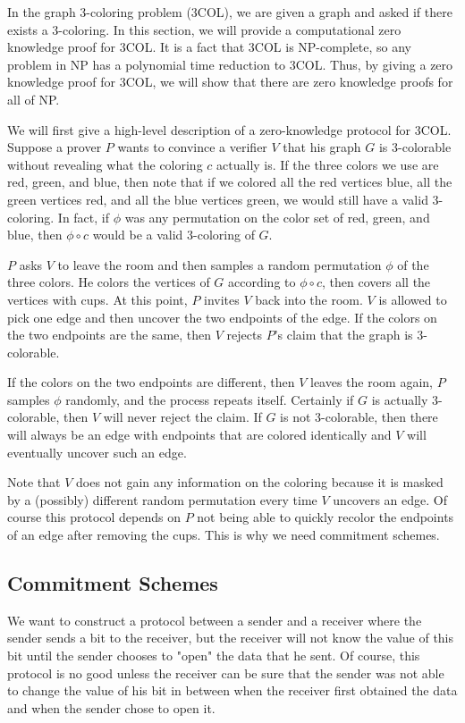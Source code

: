 \documentclass[12pt]{tufte-book}
\begin{document}
In the graph 3-coloring problem (3COL), we are given a graph and asked if there exists a 3-coloring. In this section, we will provide a computational zero knowledge proof for 3COL. It is a fact that 3COL is NP-complete, so any problem in NP has a polynomial time reduction to 3COL. Thus, by giving a zero knowledge proof for 3COL, we will show that there are zero knowledge proofs for all of NP.

We will first give a high-level description of a zero-knowledge protocol for 3COL. Suppose a prover $P$ wants to convince a verifier $V$ that his graph $G$ is 3-colorable without revealing what the coloring $c$ actually is. If the three colors we use are red, green, and blue, then note that if we colored all the red vertices blue, all the green vertices red, and all the blue vertices green, we would still have a valid 3-coloring. In fact, if $\phi$ was any permutation on the color set of red, green, and blue, then $\phi \circ c$ would be a valid 3-coloring of $G$.

$P$ asks $V$ to leave the room and then samples a random permutation $\phi$ of the three colors. He colors the vertices of $G$ according to $\phi \circ c$, then covers all the vertices with cups. At this point, $P$ invites $V$ back into the room. $V$ is allowed to pick one edge and then uncover the two endpoints of the edge. If the colors on the two endpoints are the same, then $V$ rejects $P$'s claim that the graph is 3-colorable.

If the colors on the two endpoints are different, then $V$ leaves the room again, $P$ samples $\phi$ randomly, and the process repeats itself. Certainly if $G$ is actually 3-colorable, then $V$ will never reject the claim. If $G$ is not 3-colorable, then there will always be an edge with endpoints that are colored identically and $V$ will eventually uncover such an edge.

Note that $V$ does not gain any information on the coloring because it is masked by a (possibly) different random permutation every time $V$ uncovers an edge. Of course this protocol depends on $P$ not being able to quickly recolor the endpoints of an edge after removing the cups. This is why we need commitment schemes.

\subsection{Commitment Schemes}

We want to construct a protocol between a sender and a receiver where the sender sends a bit to the receiver, but the receiver will not know the value of this bit until the sender chooses to "open" the data that he sent. Of course, this protocol is no good unless the receiver can be sure that the sender was not able to change the value of his bit in between when the receiver first obtained the data and when the sender chose to open it.
\end{document}
